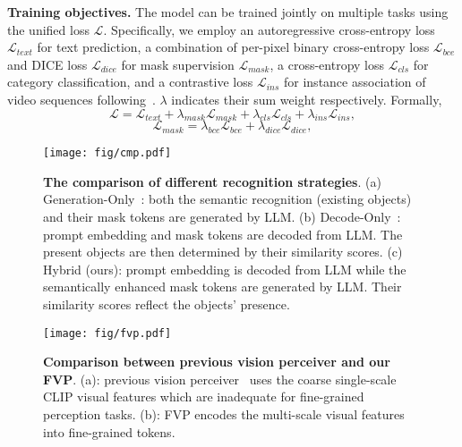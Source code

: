\noindent \textbf{Training objectives.} The model can be trained jointly on multiple tasks using the unified loss $\mathcal{L}$. Specifically, we employ an autoregressive cross-entropy loss $\mathcal{L}_{text}$ for text prediction, a combination of per-pixel binary cross-entropy loss $\mathcal{L}_{bce}$ and DICE loss $\mathcal{L}_{dice}$ for mask supervision $\mathcal{L}_{mask}$, a cross-entropy loss $\mathcal{L}_{cls}$ for category classification, and a contrastive loss $\mathcal{L}_{ins}$ for instance association of video sequences following~\cite{IDOL}. $\lambda$ indicates their sum weight respectively. Formally,
\begin{equation}
\label{eq:total_loss}
\mathcal{L}= \mathcal{L}_{text}+\lambda_{mask}\mathcal{L}_{mask}+\lambda_{cls}\mathcal{L}_{cls}+\lambda_{ins}\mathcal{L}_{ins},
\end{equation}
\vspace{-6mm}
\begin{equation}
\label{eq:mask_loss}
\mathcal{L}_{mask}=\lambda_{bce}\mathcal{L}_{bce}+\lambda_{dice}\mathcal{L}_{dice},
\end{equation}

\begin{figure*}[t]
    \centering
    \texttt{[image: fig/cmp.pdf]}
     \vspace{-5mm}
    \caption{\textbf{The comparison of different recognition strategies}. (a) Generation-Only~\cite{Lai2023LISARS, Ren2023PixelLMPR}: both the semantic recognition (existing objects) and their mask tokens are generated by LLM. 
    (b) Decode-Only~\cite{zhang2024psalm,zhang2024omg}: prompt embedding and mask tokens are decoded from LLM. The present objects are then determined by their similarity scores. (c) Hybrid (ours): prompt embedding is decoded from LLM while the semantically enhanced mask tokens are generated by LLM. Their similarity scores reflect the objects' presence.
    }
    \label{fig:cmp}
    \vspace{-3mm}
\end{figure*}

\begin{figure}[t]
    \centering
    \texttt{[image: fig/fvp.pdf]}
    \caption{\textbf{Comparison between previous vision perceiver and our FVP}. (a): previous vision perceiver~\cite{li2023blip,bai2023qwen} uses the coarse single-scale CLIP visual features which are inadequate for fine-grained perception tasks.
    (b): FVP encodes the multi-scale visual features into fine-grained tokens.  }
    \label{fig:fvp}
    \vspace{-3mm}
\end{figure}


